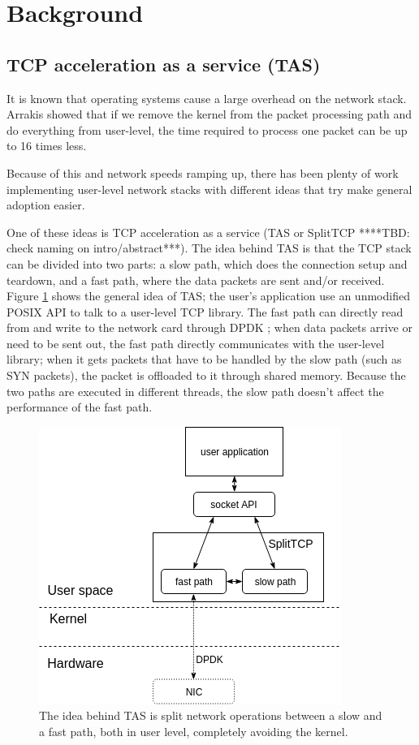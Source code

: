 \section{Background}\label{Background}

%
%

\subsection{TCP acceleration as a service (TAS)}

It is known that operating systems cause a large overhead on the network
stack. Arrakis \cite{peter:arrakis} showed that if we remove the kernel
from the packet processing path and do everything from user-level, the time 
required to process one packet can be up to 16 times less.

Because of this and network speeds ramping up, there has been plenty of work implementing
user-level network stacks \cite{mtcp, utcp, janus, alpine} with different ideas that try make general adoption
easier.

One of these ideas is TCP acceleration as a service (TAS or SplitTCP  ****TBD: check naming on intro/abstract***).
The idea behind TAS is that the TCP stack can be divided into two parts: a slow path, which does the connection
setup and teardown, and a fast path, where the data packets are sent and/or received. Figure \ref{fig:splittcp} 
shows the general idea of TAS; the user's application use an unmodified POSIX API to talk to a user-level TCP
library. The fast path can directly read from and write to the network card through DPDK \cite{dpdk}; when data packets
arrive or need to be sent out, the fast path directly communicates with the user-level library;
when it gets packets that have to be handled by the slow path (such as SYN packets), the packet 
is offloaded to it through shared memory. Because the two paths are executed in different threads, the slow path doesn't
affect the performance of the fast path.


\begin{figure}
\centering
\includegraphics[width=0.7\columnwidth]{figures/splittcp_default.png}
\caption{The idea behind TAS is split network operations between a slow and a fast path, both in user level, completely
avoiding the kernel.}
\label{fig:splittcp}
\end{figure}


